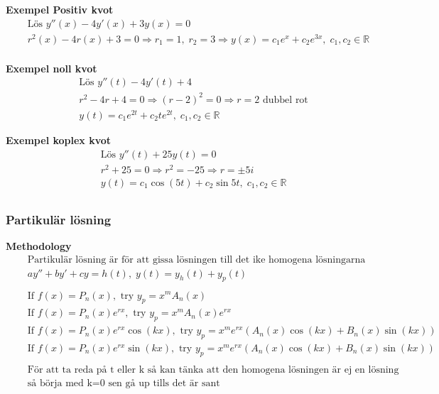 \textbf{Exempel Positiv kvot}
\begin{align*}
  &\quad  \text{Lös } y''(x)-4y'(x)+3y(x)=0 \\
  &\quad  r^2(x)-4r(x)+3=0 \Rightarrow r_1=1, \; r_2=3 \Rightarrow y(x) = c_1e^x + c_2e^{3x}, \;
  c_1,c_2 \in\mathbb{R} \\
\end{align*}

\textbf{Exempel noll kvot}
\begin{align*}
  &\quad  \text{Lös } y''(t)-4y'(t)+4 \\
  &\quad  r^2-4r+4=0 \Rightarrow {(r-2)}^2=0 \Rightarrow r=2 \text{ dubbel rot} \\
  &\quad  y(t) = c_1e^{2t} + c_2te^{2t}, \; c_1,c_2 \in\mathbb{R}
\end{align*}

\textbf{Exempel koplex kvot}
\begin{align*}
  &\quad  \text{Lös } y''(t) + 25y(t) = 0 \\
  &\quad  r^2 + 25 = 0 \Rightarrow r^2 = -25 \Rightarrow r=\pm5i \\
  &\quad  y(t) = c_1\cos(5t)+c_2\sin{5t}, \; c_1,c_2 \in\mathbb{R} \\
\end{align*}



\subsubsection{Partikulär lösning}
\textbf{Methodology}  %
\begin{align*}
  &\quad  \text{Partikulär lösning är för att gissa lösningen till det ike homogena lösningarna} \\
  &\quad  ay''+by'+cy=h(t), \; y(t) = y_h(t) + y_p(t) \\
  &\quad  \\
  &\quad  \text{If } f(x)=P_n(x), \text{ try } y_p=x^m A_n(x) \\
  &\quad  \text{If } f(x)=P_n(x)e^{rx}, \text{ try } y_p=x^m A_n(x)e^{rx} \\
  &\quad  \text{If } f(x)=P_n(x)e^{rx}\cos(kx), \text{ try } y_p=x^m e^{rx}(A_n(x)\cos(kx)+B_n(x)\sin(kx)) \\
  &\quad  \text{If } f(x)=P_n(x)e^{rx}\sin(kx), \text{ try } y_p=x^m e^{rx}(A_n(x)\cos(kx)+B_n(x)\sin(kx)) \\ 
  &\quad  \\
  &\quad  \text{För att ta reda på t eller k så kan tänka att den homogena lösningen är ej en lösning } \\
  &\quad  \text{så börja med k=0 sen gå up tills det är sant} \\
\end{align*}



